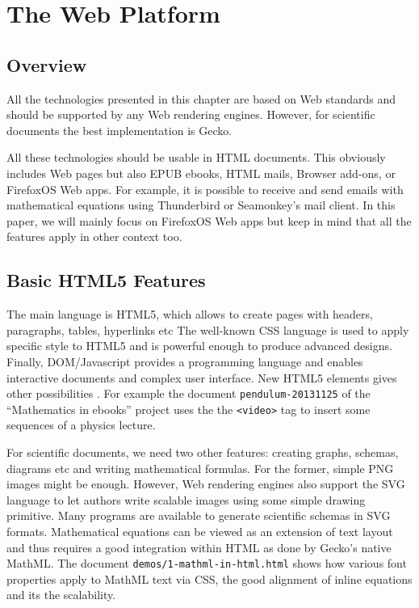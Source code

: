 \chapter{The Web Platform}

\section{Overview}

All the technologies presented in this chapter are based on Web standards and
should be supported by any Web rendering engines. However, for scientific
documents the best implementation is Gecko.

All these technologies should be usable in HTML documents. This obviously
includes Web pages but also EPUB ebooks, HTML mails, Browser add-ons, or
FirefoxOS Web apps. For example, it is possible to receive and send emails
with mathematical equations using Thunderbird or Seamonkey's mail client.
In this paper, we will mainly
focus on FirefoxOS Web apps but keep in mind that all the features apply in
other context too.

\section{Basic HTML5 Features}

The main language is HTML5, which allows to create pages with headers,
paragraphs, tables, hyperlinks etc The well-known CSS language is used to
apply specific style to HTML5 and is powerful enough to produce advanced
designs. Finally, DOM/Javascript provides a programming language and enables
interactive documents and complex user interface. New HTML5 elements
gives other possibilities . For example the document
{\tt pendulum-20131125} of the ``Mathematics in ebooks'' project uses the
the {\tt <video>} tag to insert some sequences of a physics lecture.

For scientific documents, we need two other features: creating graphs, schemas,
diagrams etc and writing mathematical formulas. For the former, simple PNG
images might be enough. However, Web rendering engines also support the SVG
language to let authors write scalable images using some simple drawing
primitive. Many programs are available to generate scientific schemas in SVG
formats. Mathematical equations can be viewed as an extension of text layout
and thus requires a good integration within HTML as done by
Gecko's native MathML. The document {\tt demos/1-mathml-in-html.html} shows how
various font properties apply to MathML text via CSS, the good alignment
of inline equations and its the scalability.

